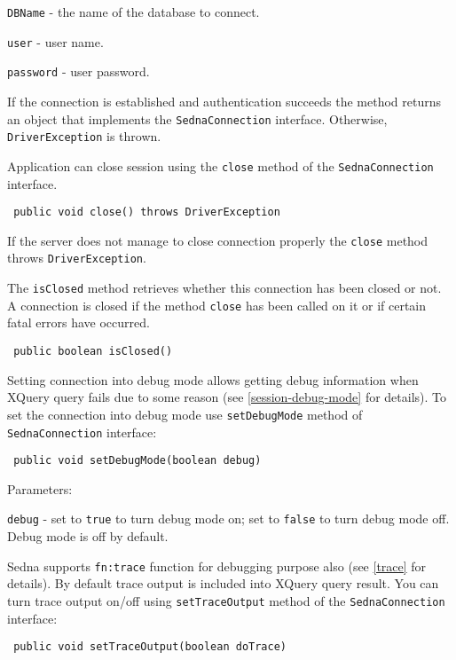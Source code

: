 \documentclass[a4paper,12pt]{article}
\begin{document}
\verb!DBName! - the name of the database to connect.

\verb!user! - user name.

\verb!password! - user password.

If the connection is established and authentication succeeds the method returns
an object that implements the \verb!SednaConnection! interface. Otherwise,
\verb!DriverException! is thrown.

Application can close session using the \verb!close! method of the
\verb!SednaConnection! interface.

\begin{verbatim}
 public void close() throws DriverException
\end{verbatim}

If the server does not manage to close connection properly the \verb!close!
method throws \verb!DriverException!.

The \verb!isClosed! method retrieves whether this connection has been closed or
not. A connection is closed if the method \verb!close! has been called on it or
if certain fatal errors have occurred.

\begin{verbatim}
 public boolean isClosed()
\end{verbatim}

Setting connection into debug mode allows getting debug information when XQuery
query fails due to some reason (see \ref{session-debug-mode} for details). To
set the connection into debug mode use \verb!setDebugMode! method of
\verb!SednaConnection! interface:

\begin{verbatim}
 public void setDebugMode(boolean debug)
\end{verbatim}

Parameters:

\verb!debug! - set to \verb!true! to turn debug mode on; set to \verb!false! to
turn debug mode off. Debug mode is off by default.

Sedna supports \verb!fn:trace! function for debugging purpose also (see
\ref{trace} for details). By default trace output is included into XQuery query
result. You can turn trace output on/off using \verb!setTraceOutput! method of
the \verb!SednaConnection! interface:

\begin{verbatim}
 public void setTraceOutput(boolean doTrace)
\end{verbatim}
\end{document}
